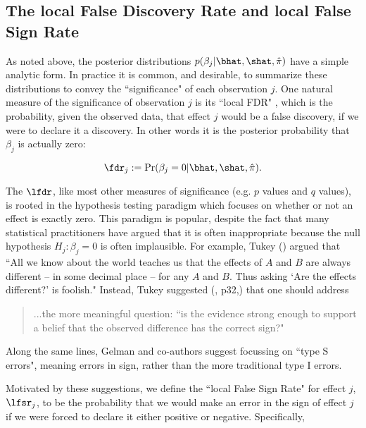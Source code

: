 \subsection*{The local False Discovery Rate and local False Sign Rate}

As noted above, the posterior distributions $p(\beta_j | \bhat, \shat, \hat{\pi})$ have a simple analytic form.
In practice it is common, and desirable, to summarize these distributions to convey the ``significance" of each observation $j$.
One natural measure of the significance of observation $j$ is its ``local FDR" \cite{efron2008microarrays}, which is
the probability, given the observed data, that effect $j$ would be a false discovery, if we were to declare it a discovery.
In other words it is the posterior probability that $\beta_j$ is actually zero:

\begin{equation}
\label{eqn:fdr}
\fdr_j := \Pr(\beta_j =0  |  \bhat, \shat, \hat{\pi}).
\end{equation}

The $\lfdr$, like most other measures of significance (e.g. $p$ values and $q$ values), is rooted in the hypothesis testing paradigm which focuses on 
whether or not an effect is exactly zero. This paradigm is popular, despite the fact that many statistical practitioners have argued that it is often inappropriate because
the null hypothesis $H_j: \beta_j=0$ is often implausible. For example, Tukey  (\cite{tukey1991philosophy}) argued that
``All we know about the world teaches us that the effects of $A$ and $B$ are always different -- in some decimal place -- for any $A$ and $B$. Thus asking `Are the effects different?' is foolish." Instead, Tukey suggested (\cite{tukey1962future}, p32,) that one should address

\begin{quote}
...the more meaningful question: ``is the evidence strong enough to support a belief that the observed difference has the correct sign?"
\end{quote}
Along the same lines, Gelman and co-authors \cite{gelman2000type, gelman2012we} suggest  
focussing on ``type S errors", meaning errors in sign, rather than the more traditional type I errors.

Motivated by these suggestions, we define the ``local False Sign Rate" for effect $j$, $\lfsr_j$, to be the probability that we
would make an error in the sign of effect $j$ if we were forced to declare it either positive or negative. Specifically,

